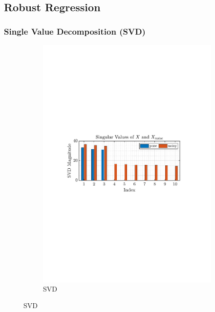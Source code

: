 \documentclass[12pt]{article}
\begin{document}
	
	
	\subsection{Robust Regression} \label{sec: 1-6-robust-regression} 
	 	\subsubsection{Single Value Decomposition (SVD)}
			\begin{figure}[H]
				\centering
				\begin{subfigure}{0.49\textwidth}
					\centering
					\includegraphics[trim={2.2cm 11.2cm 3.15cm  11.2cm}, clip, width=\textwidth]{../MATLAB/figures/q1_6a_fig01.pdf} 
					\captionsetup{justification=centering}
					\caption{SVD}
				\end{subfigure}

\end{figure}
\end{document}

